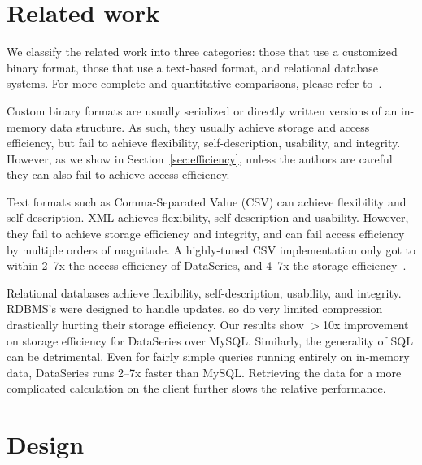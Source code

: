 \documentclass{acm_proc_article-sp}
\begin{document}
\section{Related work}\label{sec:related}

We classify the related work into three categories:
those that use a customized binary format, those that use a
text-based format, and relational database systems. 
For more complete and quantitative comparisons,
please refer to~\cite{DSTechnicalReportSnapshot}.

Custom binary formats are usually serialized or directly written
versions of an in-memory data structure.  As such, they usually
achieve storage 
and access efficiency, 
but fail to a\-chieve
flexibility, self-description, usability, and integrity.
However, as we
show in Section~\ref{sec:efficiency}, 
unless the authors are careful they can also
fail to achieve access efficiency.

Text formats such as Comma-Separated Value (CSV) can
achieve flexibility and self-description. XML achieves flexibility,
self-description and usability.  However, they fail
to achieve storage efficiency and integrity, and can fail access efficiency by
multiple orders of magnitude.  A highly-tuned CSV implementation
only got to within 2--7x the access-efficiency of DataSeries, and 4--7x
the storage efficiency~\cite{DSTechnicalReportSnapshot}.

Relational databases achieve flexibility, self-description,
usability, and integrity. RDBMS's were designed to handle updates, so
do very limited compression drastically hurting their storage
efficiency.  Our
results show $>$10x improvement on storage efficiency for DataSeries
over MySQL.
Similarly, the generality of SQL can be detrimental.  Even for fairly simple
queries running entirely on in-memory data, DataSeries runs 2--7x
faster than MySQL. 
Retrieving the data for a more complicated
calculation on the client further slows the relative performance.

\section{Design}\label{sec:design}
\end{document}
